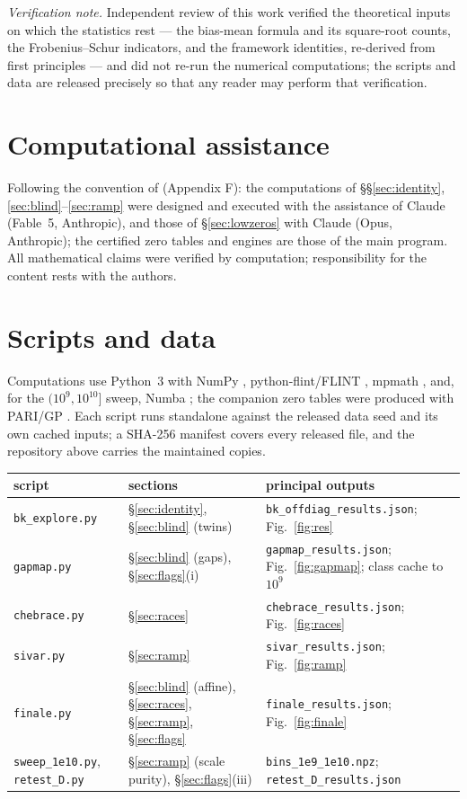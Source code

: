 \documentclass[11pt]{article}
\begin{document}
\emph{Verification note.} Independent review of this work verified the
theoretical inputs on which the statistics rest --- the bias-mean formula
and its square-root counts, the Frobenius--Schur indicators, and the
framework identities, re-derived from first principles --- and did not
re-run the numerical computations; the scripts and data are released
precisely so that any reader may perform that verification.

\appendix
\section{Computational assistance}\label{app:attr}
Following the convention of \cite{mainpaper} (Appendix F): the computations
of \S\S\ref{sec:identity},\ref{sec:blind}--\ref{sec:ramp} were designed and
executed with the assistance of Claude (Fable~5, Anthropic), and those of
\S\ref{sec:lowzeros} with Claude (Opus, Anthropic); the certified zero
tables and engines are those of the main program. All mathematical claims
were verified by computation; responsibility for the content rests with the
authors.

\section{Scripts and data}\label{app:scripts}
Computations use Python~3 with NumPy \cite{numpy}, python-flint/FLINT
\cite{flint}, mpmath \cite{mpmath}, and, for the $(10^9,10^{10}]$ sweep,
Numba \cite{numba}; the companion zero tables were produced with PARI/GP
\cite{pari}. Each script runs standalone against the released data seed and
its own cached inputs; a SHA-256 manifest covers every released file, and
the repository above carries the maintained copies.

\begin{center}
\begin{tabular}{lll}
\toprule
script & sections & principal outputs \\
\midrule
\texttt{bk\_explore.py} & \S\ref{sec:identity}, \S\ref{sec:blind} (twins) &
\texttt{bk\_offdiag\_results.json}; Fig.~\ref{fig:res} \\
\texttt{gapmap.py} & \S\ref{sec:blind} (gaps), \S\ref{sec:flags}(i) &
\texttt{gapmap\_results.json}; Fig.~\ref{fig:gapmap}; class cache to $10^9$ \\
\texttt{chebrace.py} & \S\ref{sec:races} &
\texttt{chebrace\_results.json}; Fig.~\ref{fig:races} \\
\texttt{sivar.py} & \S\ref{sec:ramp} &
\texttt{sivar\_results.json}; Fig.~\ref{fig:ramp} \\
\texttt{finale.py} & \S\ref{sec:blind} (affine), \S\ref{sec:races},
\S\ref{sec:ramp}, \S\ref{sec:flags} & \texttt{finale\_results.json};
Fig.~\ref{fig:finale} \\
\texttt{sweep\_1e10.py}, \texttt{retest\_D.py} & \S\ref{sec:ramp} (scale
purity), \S\ref{sec:flags}(iii) & \texttt{bins\_1e9\_1e10.npz};
\texttt{retest\_D\_results.json} \\
\bottomrule
\end{tabular}
\end{center}
\end{document}
